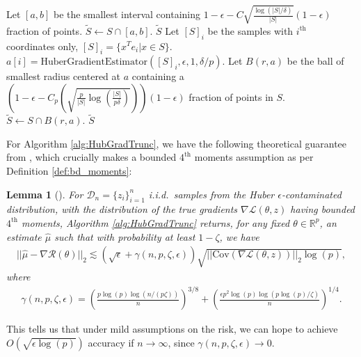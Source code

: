 \documentclass{article}
\newtheorem{lemma}{Lemma}
\newcommand{\iid}{i.i.d.{\ }}
\begin{document}
\begin{algorithm}
\caption{Huber Outlier Gradients Truncation}\label{alg:HuOutlier}
\begin{algorithmic}[1]
        \State Let $[a, b]$ be the smallest interval containing $1 - \epsilon - C\sqrt{\frac{\log(|S|/\delta)}{|S|}}(1 - \epsilon)$ fraction of points.
        \State $\widetilde{S} \gets S \cap [a, b]$.
        \State \Return $\widetilde{S}$
    \Else
    \State Let $[S]_i$ be the samples with $i^{\text{th}}$ coordinates only, $[S]_i = \{x^Te_i | x \in S\}$.
            \State $a[i] = \text{HuberGradientEstimator}([S]_i, \epsilon, 1, \delta/p)$.
        \EndFor
        \State Let $B(r, a)$ be the ball of smallest radius centered at $a$ containing a $\left(1 - \epsilon - C_p\left(\sqrt{\frac{p}{|S|}\log\left(\frac{|S|}{p\delta}\right)}\right)\right)(1 - \epsilon)$ fraction of points in $S$.
        \State $\widetilde{S} \gets S \cap B(r, a)$.
        \State \Return $\widetilde{S}$
    \EndIf
\EndFunction
\end{algorithmic}
\end{algorithm}

For Algorithm \ref{alg:HubGradTrunc}, we have the following theoretical guarantee from \cite{RE}, which crucially makes a bounded $4^{\text{th}}$ moments assumption as per Definition \ref{def:bd_moments}:

\begin{lemma}[\cite{RE}]
\label{lemma:5}
For $\mathcal{D}_n = \{z_i\}_{i = 1}^n$ \iid samples from the Huber $\epsilon$-contaminated distribution, with the distribution of the true gradients $\nabla \mathcal{L}(\theta, z)$ having bounded $4^{\text{th}}$ moments, Algorithm \ref{alg:HubGradTrunc} returns, for any fixed $\theta \in \mathbb{R}^p$, an estimate $\widehat{\mu}$ such that with probability at least $1 - \zeta$, we have
\begin{align*}
||\widehat{\mu} - \nabla\mathcal{R}(\theta)||_2 \lesssim (\sqrt{\epsilon} + \gamma(n, p, \zeta, \epsilon))\sqrt{||\mathrm{\mathrm{Cov}}(\nabla \mathcal{L}(\theta, z))||_2\log(p)},
\end{align*}
where 
\begin{align*}
\gamma(n, p, \zeta, \epsilon) = \left(\frac{p\log(p)\log(n/(p\zeta))}{n}\right)^{3/8} + \left(\frac{\epsilon p^2 \log(p)\log(p \log(p)/\zeta)}{n}\right)^{1/4}.
\end{align*}
\end{lemma}
This tells us that under mild assumptions on the risk, we can hope to achieve $O\left(\sqrt{\epsilon \log(p)}\right)$ accuracy if $n \rightarrow \infty$, since $\gamma(n, p, \zeta, \epsilon) \rightarrow 0$. 
\end{document}
